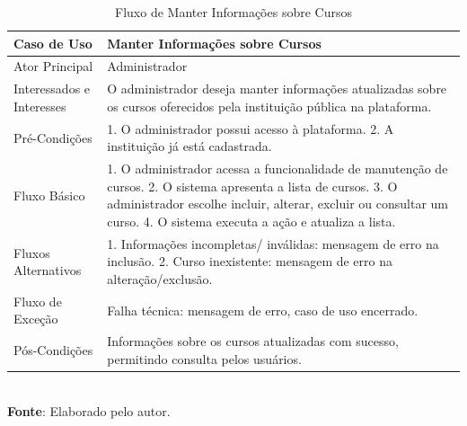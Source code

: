 \begin{table}[h!]
\centering
\caption{Fluxo de Manter Informações sobre Cursos}
\begin{tabular}{|m{4cm}|m{11cm}|}
\hline
\textbf{Caso de Uso}   & \textbf{Manter Informações sobre Cursos} \\
\hline
Ator Principal & Administrador\\
\hline
Interessados e Interesses & O administrador deseja manter informações atualizadas sobre os cursos oferecidos pela instituição pública na plataforma. \\
\hline
Pré-Condições & 

1. O administrador possui acesso à plataforma.
2. A instituição já está cadastrada. \\
\hline
Fluxo Básico & 
1. O administrador acessa a funcionalidade de manutenção de cursos.
2. O sistema apresenta a lista de cursos.
3. O administrador escolhe incluir, alterar, excluir ou consultar um curso.
4. O sistema executa a ação e atualiza a lista.
\\
\hline
Fluxos Alternativos & 

1. Informações incompletas/ inválidas: mensagem de erro na inclusão.
2. Curso inexistente: mensagem de erro na alteração/exclusão.
\\
\hline
Fluxo de Exceção & Falha técnica: mensagem de erro, caso de uso encerrado. \\
\hline
Pós-Condições & Informações sobre os cursos atualizadas com sucesso, permitindo consulta pelos usuários.\\
\hline
\end{tabular}
\label{table:casos-de-uso}
\\[1ex]
\footnotesize \textbf{Fonte}: Elaborado pelo autor.
\end{table}

